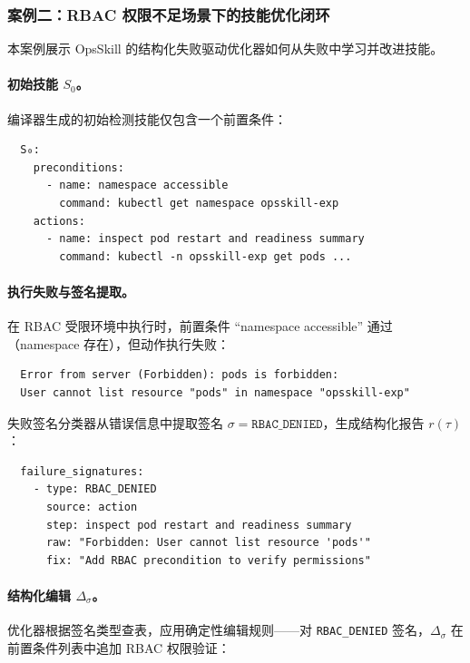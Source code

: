 \documentclass[11pt,a4paper]{ctexart}
\begin{document}
\subsubsection{案例二：RBAC 权限不足场景下的技能优化闭环}

本案例展示 OpsSkill 的结构化失败驱动优化器如何从失败中学习并改进技能。

\paragraph{初始技能 $S_0$。}编译器生成的初始检测技能仅包含一个前置条件：

\begin{small}
\begin{verbatim}
  S₀:
    preconditions:
      - name: namespace accessible
        command: kubectl get namespace opsskill-exp
    actions:
      - name: inspect pod restart and readiness summary
        command: kubectl -n opsskill-exp get pods ...
\end{verbatim}
\end{small}

\paragraph{执行失败与签名提取。}在 RBAC 受限环境中执行时，前置条件 ``namespace accessible'' 通过（namespace 存在），但动作执行失败：
\begin{small}
\begin{verbatim}
  Error from server (Forbidden): pods is forbidden:
  User cannot list resource "pods" in namespace "opsskill-exp"
\end{verbatim}
\end{small}

\noindent 失败签名分类器从错误信息中提取签名 $\sigma = \texttt{RBAC\_DENIED}$，生成结构化报告 $r(\tau)$：
\begin{small}
\begin{verbatim}
  failure_signatures:
    - type: RBAC_DENIED
      source: action
      step: inspect pod restart and readiness summary
      raw: "Forbidden: User cannot list resource 'pods'"
      fix: "Add RBAC precondition to verify permissions"
\end{verbatim}
\end{small}

\paragraph{结构化编辑 $\Delta_\sigma$。}优化器根据签名类型查表，应用确定性编辑规则——对 \texttt{RBAC\_DENIED} 签名，$\Delta_\sigma$ 在前置条件列表中追加 RBAC 权限验证：
\end{document}
